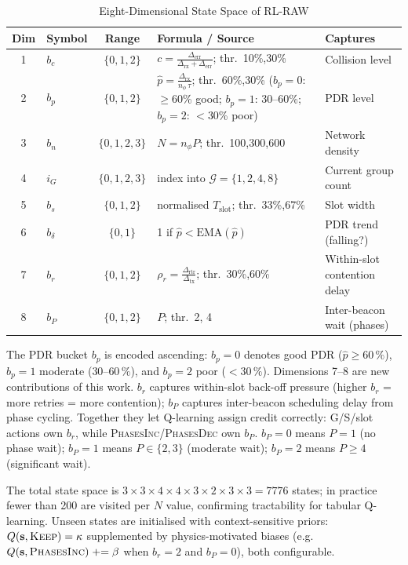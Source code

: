 \documentclass[conference]{IEEEtran}
\begin{document}
\begin{table}[h]
\centering
\caption{Eight-Dimensional State Space of RL-RAW}
\label{tab:state}
\setlength{\tabcolsep}{3pt}
{\scriptsize
\begin{tabular}{clcll}
\toprule
Dim & Symbol & Range & Formula / Source & Captures \\
\midrule
1 & $b_c$ & $\{0,1,2\}$
  & $c=\frac{\Delta_\text{err}}{\Delta_\text{rx}+\Delta_\text{err}}$;
    thr.\ 10\%,30\%
  & Collision level \\[3pt]
2 & $b_p$ & $\{0,1,2\}$
  & $\hat{p}=\frac{\Delta_\text{rx}}{n_\phi\,\tau}$; thr.\ 60\%,30\%
    ($b_p{=}0$: $\geq$60\% good; $b_p{=}1$: 30–60\%; $b_p{=}2$: $<$30\% poor)
  & PDR level \\[3pt]
3 & $b_n$ & $\{0,1,2,3\}$
  & $N=n_\phi P$; thr.\ 100,300,600
  & Network density \\[3pt]
4 & $i_G$ & $\{0,1,2,3\}$
  & index into $\mathcal{G}=\{1,2,4,8\}$
  & Current group count \\[3pt]
5 & $b_s$ & $\{0,1,2\}$
  & normalised $T_\text{slot}$; thr.\ 33\%,67\%
  & Slot width \\[3pt]
6 & $b_\delta$ & $\{0,1\}$
  & 1 if $\hat{p}<\mathrm{EMA}(\hat{p})$
  & PDR trend (falling?) \\[3pt]
7 & $b_r$ & $\{0,1,2\}$
  & $\rho_r=\frac{\Delta_\text{rtr}}{\Delta_\text{tx}}$;
    thr.\ 30\%,60\%
  & Within-slot contention delay \\[3pt]
8 & $b_P$ & $\{0,1,2\}$
  & $P$; thr.\ 2, 4
  & Inter-beacon wait (phases) \\
\bottomrule
\end{tabular}
}
\end{table}

The PDR bucket $b_p$ is encoded ascending: $b_p=0$ denotes good PDR
($\hat{p}\geq60\,\%$), $b_p=1$ moderate ($30\text{--}60\,\%$), and
$b_p=2$ poor ($<30\,\%$).
Dimensions 7--8 are new contributions of this work.
$b_r$ captures within-slot back-off pressure (higher $b_r$ = more retries
= more contention); $b_P$ captures inter-beacon scheduling delay from phase
cycling.
Together they let Q-learning assign credit correctly: G/S/slot actions own
$b_r$, while \textsc{PhasesInc}/\textsc{PhasesDec} own $b_P$.
$b_P = 0$ means $P=1$ (no phase wait); $b_P = 1$ means $P\in\{2,3\}$
(moderate wait); $b_P = 2$ means $P\geq 4$ (significant wait).

The total state space is
$3\!\times\!3\!\times\!4\!\times\!4\!\times\!3\!\times\!2\!\times\!3\!\times\!3 = 7776$
states; in practice fewer than 200 are visited per $N$ value, confirming
tractability for tabular Q-learning.
Unseen states are initialised with context-sensitive priors:
$Q(\mathbf{s},\textsc{Keep}) = \kappa$ supplemented by physics-motivated biases
(e.g.\ $Q(\mathbf{s},\textsc{PhasesInc}) \mathrel{+}= \beta$ when
$b_r = 2$ and $b_P = 0$), both configurable.
\end{document}
